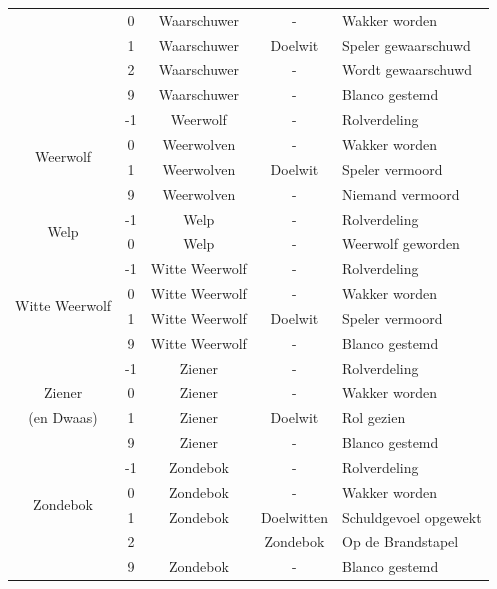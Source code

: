 \documentclass[12pt]{article}
\begin{document}
\begin{center}
\begin{longtable}{c|c|c|c|l}
       & 0 & Waarschuwer & - & Wakker worden \\
       & 1 & Waarschuwer & Doelwit & Speler gewaarschuwd \\
       & 2 & Waarschuwer & - & Wordt gewaarschuwd \\
       & 9 & Waarschuwer & - & Blanco gestemd \\
      \hline
      \multirow{4}{*}{Weerwolf} & -1 & Weerwolf & - & Rolverdeling \\
       & 0 & Weerwolven & - & Wakker worden \\
       & 1 & Weerwolven & Doelwit & Speler vermoord \\
       & 9 & Weerwolven & - & Niemand vermoord \\
      \hline
      \multirow{2}{*}{Welp} & -1 & Welp & - & Rolverdeling \\
       & 0 & Welp & - & Weerwolf geworden \\
      \hline
      \multirow{4}{*}{Witte Weerwolf} & -1 & Witte Weerwolf & - & Rolverdeling \\
       & 0 & Witte Weerwolf & - & Wakker worden \\
       & 1 & Witte Weerwolf & Doelwit & Speler vermoord \\
       & 9 & Witte Weerwolf & - & Blanco gestemd \\
      \hline
       & -1 & Ziener & - & Rolverdeling \\
      Ziener & 0 & Ziener & - & Wakker worden \\
      (en Dwaas) & 1 & Ziener & Doelwit & Rol gezien \\
       & 9 & Ziener & - & Blanco gestemd \\
      \hline
      \multirow{4}{*}{Zondebok} & -1 & Zondebok & - & Rolverdeling \\
       & 0 & Zondebok & - & Wakker worden \\
       & 1 & Zondebok & Doelwitten & Schuldgevoel opgewekt \\
       & 2 & & Zondebok & Op de Brandstapel \\
       & 9 & Zondebok & - & Blanco gestemd \\
    \end{longtable}
  \end{center}
\end{document}
